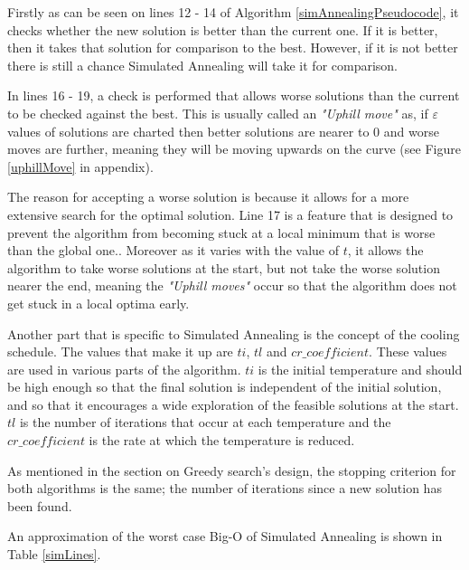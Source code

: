 \documentclass[12pt]{report}
\begin{document}
Firstly as can be seen on lines 12 - 14 of Algorithm \ref{simAnnealingPseudocode}, it checks whether the new solution is better than the current one. If it is better, then it takes that solution for comparison to the best. However, if it is not better there is still a chance Simulated Annealing will take it for comparison. 

In lines 16 - 19, a check is performed that allows worse solutions than the current to be checked against the best. This is usually called an \textit{"Uphill move"} as, if $\varepsilon$ values of solutions are charted then better solutions are nearer to 0 and worse moves are further, meaning they will be moving upwards on the curve (see Figure \ref{uphillMove} in appendix).

The reason for accepting a worse solution is because it allows for a more extensive search for the optimal solution. Line 17 is a feature that is designed to prevent the algorithm from becoming stuck at a local minimum that is worse than the global one.\cite{simAnnealing}. Moreover as it varies with the value of $t$, it allows the algorithm to take worse solutions at the start, but not take the worse solution nearer the end, meaning the \textit{"Uphill moves"} occur so that the algorithm does not get stuck in a local optima early.

Another part that is specific to Simulated Annealing is the concept of the cooling schedule. The values that make it up are $ti$, $tl$ and $cr\_coefficient$. These values are used in various parts of the algorithm. $ti$ is the initial temperature and should be high enough so that the final solution is independent of the initial solution, and so that it encourages a wide exploration of the feasible solutions at the start. $tl$ is the number of iterations that occur at each temperature and the $cr\_coefficient$ is the rate at which the temperature is reduced.

As mentioned in the section on Greedy search's design, the stopping criterion for both algorithms is the same; the number of iterations since a new solution has been found. 

An approximation of the worst case Big-O of Simulated Annealing is shown in Table \ref{simLines}.
\end{document}
